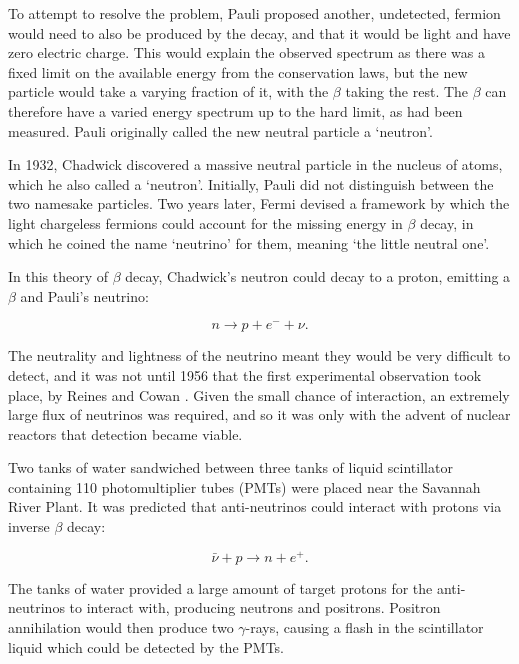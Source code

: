 To attempt to resolve the problem, Pauli \cite{pauli} proposed another, undetected, fermion would need to also be produced by the decay, and that it would be light and have zero electric charge. This would explain the observed spectrum as there was a fixed limit on the available energy from the conservation laws, but the new particle would take a varying fraction of it, with the $\beta$ taking the rest. The $\beta$ can therefore have a varied energy spectrum up to the hard limit, as had been measured. Pauli originally called the new neutral particle a `neutron'.

In 1932, Chadwick discovered a massive neutral particle in the nucleus of atoms, which he also called a `neutron'. Initially, Pauli did not distinguish between the two namesake particles. Two years later, Fermi devised a framework by which the light chargeless fermions could account for the missing energy\cite{fermi} in $\beta$ decay, in which he coined the name `neutrino' for them, meaning `the little neutral one'.

In this theory of $\beta$ decay, Chadwick's neutron could decay to a proton, emitting a $\beta$ and Pauli's neutrino:

\begin{equation}
n \rightarrow p + e^- + \nu.
\end{equation}

The neutrality and lightness of the neutrino meant they would be very difficult to detect, and it was not until 1956 that the first experimental observation took place, by Reines and Cowan \cite{cowan}. Given the small chance of interaction, an extremely large flux of neutrinos was required, and so it was only with the advent of nuclear reactors that detection became viable.

Two tanks of water sandwiched between three tanks of liquid scintillator containing 110 photomultiplier tubes (PMTs) were placed near the Savannah River Plant. It was predicted that anti-neutrinos could interact with protons via inverse $
\beta$ decay:

\begin{equation}
\bar{\nu} + p \rightarrow n + e^+.
\end{equation}

The tanks of water provided a large amount of target protons for the anti-neutrinos to interact with, producing neutrons and positrons. Positron annihilation would then produce two $\gamma$-rays, causing a flash in the scintillator liquid which could be detected by the PMTs.

